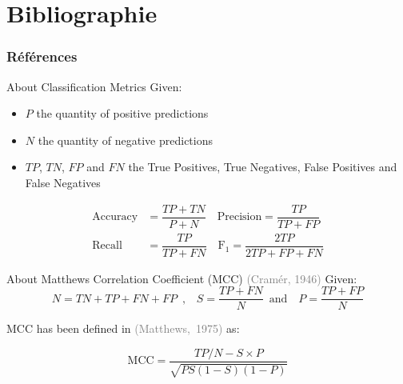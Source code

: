 \documentclass[11pt,aspectratio=169]{beamer}
\begin{document}
\section{Bibliographie}

\begin{frame}[t,allowframebreaks]
\frametitle{Références}
\printbibliography
\end{frame}


\appendix

\begin{frame}{About Classification Metrics}
    Given:
    \begin{itemize}
        \item $P$ the quantity of positive predictions
        \item $N$ the quantity of negative predictions
        \item $\mathit{TP}$, $\mathit{TN}$, $\mathit{FP}$ and $\mathit{FN}$ the True Positives, True Negatives, False Positives and False Negatives
    \end{itemize}
        \begin{align}
        \text{Accuracy} & = \dfrac{\mathit{TP} + \mathit{TN}}{P+N} \quad
        \text{Precision} = \dfrac{\mathit{TP}}{\mathit{TP}+\mathit{FP}} \\[0.5ex]
        \text{Recall} & = \dfrac{\mathit{TP}}{\mathit{TP}+\mathit{FN}}\quad 
        \text{F}_1 = \dfrac{2\mathit{TP}}{2\mathit{TP}+\mathit{FP}+\mathit{FN}}
    \end{align}
    \end{frame}
    
    \begin{frame}{About Matthews Correlation Coefficient (MCC) \textcolor{gray}{\footnotesize (Cramér, 1946)}}
        Given:
        \begin{equation}
    N = \mathit{TN}+\mathit{TP}+\mathit{FN}+\mathit{FP} \enspace \text{,} \quad S = \frac{\mathit{TP}+\mathit{FN}}{N} \enspace \text{and} \quad P = \frac{\mathit{TP}+\mathit{FP}}{N}
    \end{equation}
    
    MCC has been defined in \textcolor{gray}{\footnotesize (Matthews,~1975)} as:
    
    \begin{equation}
        \text{MCC} = \frac{\mathit{TP}/ N-S \times P}{\sqrt{P S(1-S)(1-P)}}
    \end{equation}
    \end{frame}
        
\end{document}
